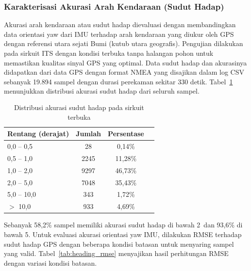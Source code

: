 \subsubsection{Karakterisasi Akurasi Arah Kendaraan (Sudut Hadap)}
\label{sec:akurasi_heading}

Akurasi arah kendaraan atau sudut hadap dievaluasi dengan membandingkan data orientasi yaw dari IMU terhadap arah kendaraan yang diukur oleh GPS dengan referensi utara sejati Bumi (kutub utara geografis).
Pengujian dilakukan pada sirkuit ITS dengan kondisi terbuka tanpa halangan pohon untuk memastikan kualitas sinyal GPS yang optimal.
Data sudut hadap dan akurasinya didapatkan dari data GPS dengan format NMEA yang disajikan dalam log CSV sebanyak 19.894 sampel dengan durasi perekaman sekitar 330 detik.
Tabel~\ref{tab:head_acc_dist} menunjukkan distribusi akurasi sudut hadap dari seluruh sampel.

\begin{table}[H]
\centering
\footnotesize
\caption{Distribusi akurasi sudut hadap pada sirkuit terbuka}
\label{tab:head_acc_dist}
\begin{tabular}{l c c c}
\hline
\textbf{Rentang (derajat)} & \textbf{Jumlah} & \textbf{Persentase}\\
\hline
0,0 -- 0,5   & 28    & 0,14\%  \\
0,5 -- 1,0   & 2245  & 11,28\% \\
1,0 -- 2,0   & 9297  & 46,73\% \\
2,0 -- 5,0   & 7048  & 35,43\% \\
5,0 -- 10,0  & 343   & 1,72\%  \\
$>$ 10,0     & 933   & 4,69\%  \\
\hline
\end{tabular}
\end{table}

Sebanyak 58,2\% sampel memiliki akurasi sudut hadap di bawah 2\textdegree\ dan 93,6\% di bawah 5\textdegree.
Untuk evaluasi akurasi orientasi yaw IMU, dilakukan RMSE terhadap sudut hadap GPS dengan beberapa kondisi batasan untuk menyaring sampel yang valid.
Tabel~\ref{tab:heading_rmse} menyajikan hasil perhitungan RMSE dengan variasi kondisi batasan.


